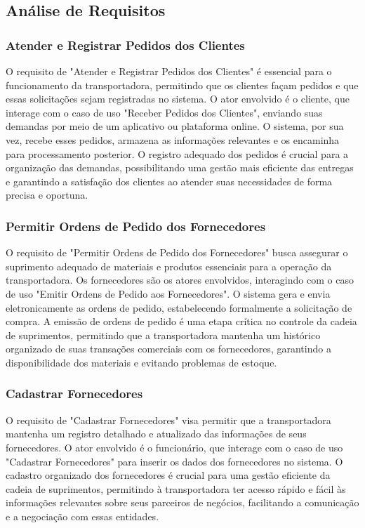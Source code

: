 \subsection{Análise de Requisitos}

\subsubsection{Atender e Registrar Pedidos dos Clientes}

O requisito de "Atender e Registrar Pedidos dos Clientes" é essencial para o funcionamento da transportadora, permitindo que os clientes façam pedidos e que essas solicitações sejam registradas no sistema. O ator envolvido é o cliente, que interage com o caso de uso "Receber Pedidos dos Clientes", enviando suas demandas por meio de um aplicativo ou plataforma online. O sistema, por sua vez, recebe esses pedidos, armazena as informações relevantes e os encaminha para processamento posterior. O registro adequado dos pedidos é crucial para a organização das demandas, possibilitando uma gestão mais eficiente das entregas e garantindo a satisfação dos clientes ao atender suas necessidades de forma precisa e oportuna.

\subsubsection{Permitir Ordens de Pedido dos Fornecedores}

O requisito de "Permitir Ordens de Pedido dos Fornecedores" busca assegurar o suprimento adequado de materiais e produtos essenciais para a operação da transportadora. Os fornecedores são os atores envolvidos, interagindo com o caso de uso "Emitir Ordens de Pedido aos Fornecedores". O sistema gera e envia eletronicamente as ordens de pedido, estabelecendo formalmente a solicitação de compra. A emissão de ordens de pedido é uma etapa crítica no controle da cadeia de suprimentos, permitindo que a transportadora mantenha um histórico organizado de suas transações comerciais com os fornecedores, garantindo a disponibilidade dos materiais e evitando problemas de estoque.

\subsubsection{Cadastrar Fornecedores}

O requisito de "Cadastrar Fornecedores" visa permitir que a transportadora mantenha um registro detalhado e atualizado das informações de seus fornecedores. O ator envolvido é o funcionário, que interage com o caso de uso "Cadastrar Fornecedores" para inserir os dados dos fornecedores no sistema. O cadastro organizado dos fornecedores é crucial para uma gestão eficiente da cadeia de suprimentos, permitindo à transportadora ter acesso rápido e fácil às informações relevantes sobre seus parceiros de negócios, facilitando a comunicação e a negociação com essas entidades.

